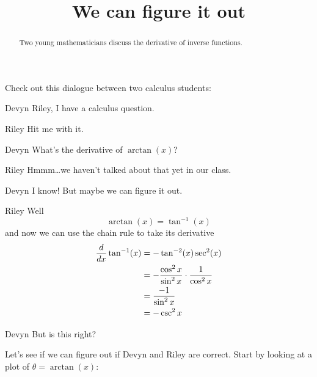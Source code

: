 \documentclass{ximera}
\title[Break-Ground:]{We can figure it out}
\begin{document}
\begin{abstract}
Two young mathematicians discuss the derivative of inverse functions.
\end{abstract}
\maketitle

Check out this dialogue between two calculus students:

\begin{dialogue}
\item[Devyn] Riley, I have a calculus question.
\item[Riley] Hit me with it.
\item[Devyn] What's the derivative of $\arctan(x)$?
\item[Riley] Hmmm\dots we haven't talked about that yet in our class.
\item[Devyn] I know! But maybe we can figure it out.
\item[Riley] Well
  \[
  \arctan(x) = \tan^{-1}(x)
  \]
  and now we can use the chain rule to take its derivative
  \begin{align*}
    \frac{d}{dx} \tan^{-1}(x) &= -\tan^{-2}(x)\sec^2(x)\\
    &= -\frac{\cos^2x}{\sin^2x}\cdot \frac{1}{\cos^2x}\\
    &= \frac{-1}{\sin^2x}\\
    &= -\csc^2x
  \end{align*}
\item[Devyn] But is this right?
\end{dialogue}

Let's see if we can figure out if Devyn and Riley are correct. Start by looking at a plot of $\theta = \arctan(x)$:

\begin{image}
\end{image}
\end{document}
